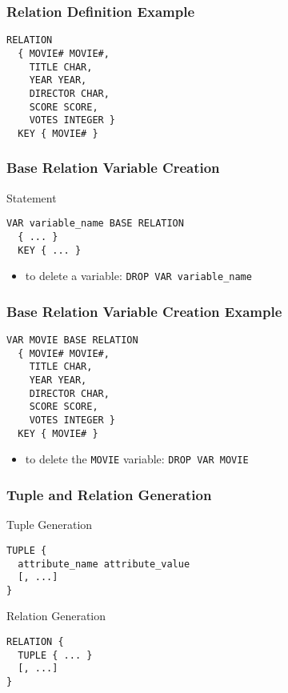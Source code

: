 \documentclass[dvipsnames]{beamer}
\theoremstyle{plain}
\begin{document}
\begin{frame}[fragile]
  \frametitle{Relation Definition Example}

  \begin{example}
    \begin{lstlisting}
RELATION
  { MOVIE# MOVIE#,
    TITLE CHAR,
    YEAR YEAR,
    DIRECTOR CHAR,
    SCORE SCORE,
    VOTES INTEGER }
  KEY { MOVIE# }
    \end{lstlisting}
  \end{example}
\end{frame}

\begin{frame}[fragile]
  \frametitle{Base Relation Variable Creation}

  \begin{block}{Statement}
    \begin{lstlisting}
VAR variable_name BASE RELATION
  { ... }
  KEY { ... }
    \end{lstlisting}
  \end{block}

  \pause
  \begin{itemize}
    \item to delete a variable: \lstinline!DROP VAR variable_name!
  \end{itemize}
\end{frame}

\begin{frame}[fragile]
  \frametitle{Base Relation Variable Creation Example}

  \begin{example}
    \begin{lstlisting}
VAR MOVIE BASE RELATION
  { MOVIE# MOVIE#,
    TITLE CHAR,
    YEAR YEAR,
    DIRECTOR CHAR,
    SCORE SCORE,
    VOTES INTEGER }
  KEY { MOVIE# }
    \end{lstlisting}

    \pause
    \bigskip
    \begin{itemize}
      \item to delete the \texttt{MOVIE} variable: \lstinline!DROP VAR MOVIE!
    \end{itemize}
  \end{example}
\end{frame}

\begin{frame}[fragile]
  \frametitle{Tuple and Relation Generation}

  \begin{block}{Tuple Generation}
    \begin{lstlisting}
TUPLE {
  attribute_name attribute_value
  [, ...]
}
    \end{lstlisting}
  \end{block}

  \pause
  \begin{block}{Relation Generation}
    \begin{lstlisting}
RELATION {
  TUPLE { ... }
  [, ...]
}
    \end{lstlisting}
  \end{block}
\end{frame}
\end{document}

